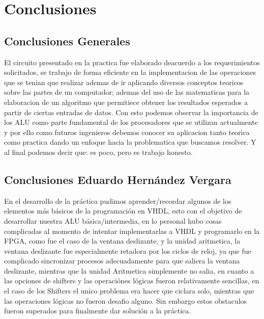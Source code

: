 \section{Conclusiones}
	\subsection{Conclusiones Generales}
	El circuito presentado en la practica fue elaborado deacuerdo a los requerimientos solicitados, se trabajo de forma eficiente en la implementacion de las operaciones que se tenian que realizar ademas de ir aplicando diversos conceptos teoricos sobre las partes de un computador; ademas del uso de las matematicas para la elaboracion de un algoritmo que permitiece obtener los resultados esperados a partir de ciertas entradas de datos. Con esto podemos observar la importancia de los ALU como parte fundamental de los procesadores que se utilizan actualmente y por ello como futuros ingenieros debemos conocer su aplicacion tanto teorica como practica dando un enfoque hacia la problematica que buscamos resolver. Y al final podemos decir que: es poco, pero es trabajo honesto.
	\subsection{Conclusiones Eduardo Hern\'andez Vergara}
		En el desarrollo de la pr\'actica pudimos aprender/recordar algunos de los elementos m\'as b\'asicos de la programaci\'on en VHDL, esto con el objetivo de desarrollar nuestra ALU b\'asica/intermedia, en lo personal hubo cosas complicadas al momento de intentar implementarlas a VHDL y programarlo en la FPGA, como fue el caso de la ventana deslizante, y la unidad aritmetica, la ventana deslizante fue especialmente retadora por los ciclos de reloj, ya que fue complicado sincronizar procesos adecuadamente para que saliera la ventana deslizante, mientras que la unidad Aritmetica simplemente no salia, en cuanto a las opciones de shifters y las operaci\'ones l\'ogicas fueron relativamente sencillas, en el caso de los Shifters el unico problema era hacer que ciclara solo, mientras que las operaciones l\'ogicas no fueron desafio alguno. Sin embargo estos obstaculos fueron superados para finalmente dar soluci\'on a la pr\'actica.
